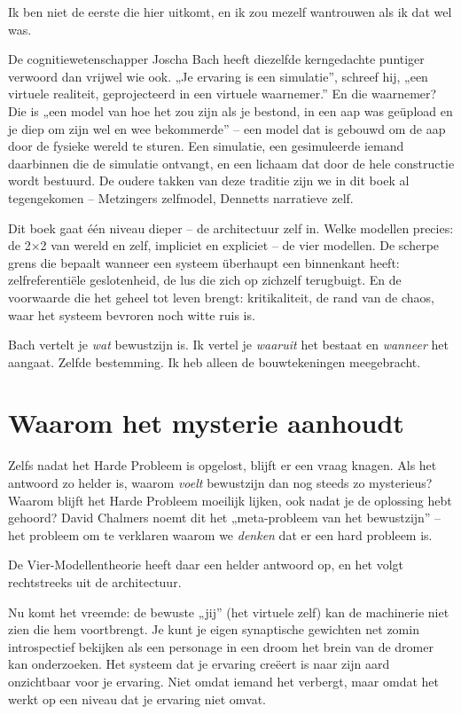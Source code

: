 \documentclass[11pt, twoside, openright]{book}
\begin{document}
Ik ben niet de eerste die hier uitkomt, en ik zou mezelf wantrouwen als ik dat wel was.

De cognitiewetenschapper Joscha Bach heeft diezelfde kerngedachte puntiger verwoord dan vrijwel wie ook. „Je ervaring is een simulatie”, schreef hij, „een virtuele realiteit, geprojecteerd in een virtuele waarnemer.” En die waarnemer? Die is „een model van hoe het zou zijn als je bestond, in een aap was geüpload en je diep om zijn wel en wee bekommerde” -- een model dat is gebouwd om de aap door de fysieke wereld te sturen. Een simulatie, een gesimuleerde iemand daarbinnen die de simulatie ontvangt, en een lichaam dat door de hele constructie wordt bestuurd. De oudere takken van deze traditie zijn we in dit boek al tegengekomen -- Metzingers zelfmodel, Dennetts narratieve zelf.

Dit boek gaat één niveau dieper -- de architectuur zelf in. Welke modellen precies: de 2×2 van wereld en zelf, impliciet en expliciet -- de vier modellen. De scherpe grens die bepaalt wanneer een systeem überhaupt een binnenkant heeft: zelfreferentiële geslotenheid, de lus die zich op zichzelf terugbuigt. En de voorwaarde die het geheel tot leven brengt: kritikaliteit, de rand van de chaos, waar het systeem bevroren noch witte ruis is.

Bach vertelt je \textit{wat} bewustzijn is. Ik vertel je \textit{waaruit} het bestaat en \textit{wanneer} het aangaat. Zelfde bestemming. Ik heb alleen de bouwtekeningen meegebracht.

\section*{Waarom het mysterie aanhoudt}

Zelfs nadat het Harde Probleem is opgelost, blijft er een vraag knagen. Als het antwoord zo helder is, waarom \textit{voelt} bewustzijn dan nog steeds zo mysterieus? Waarom blijft het Harde Probleem moeilijk lijken, ook nadat je de oplossing hebt gehoord? David Chalmers noemt dit het „meta-probleem van het bewustzijn” -- het probleem om te verklaren waarom we \textit{denken} dat er een hard probleem is.

De Vier-Modellentheorie heeft daar een helder antwoord op, en het volgt rechtstreeks uit de architectuur.

Nu komt het vreemde: de bewuste „jij” (het virtuele zelf) kan de machinerie niet zien die hem voortbrengt. Je kunt je eigen synaptische gewichten net zomin introspectief bekijken als een personage in een droom het brein van de dromer kan onderzoeken. Het systeem dat je ervaring creëert is naar zijn aard onzichtbaar voor je ervaring. Niet omdat iemand het verbergt, maar omdat het werkt op een niveau dat je ervaring niet omvat.
\end{document}

